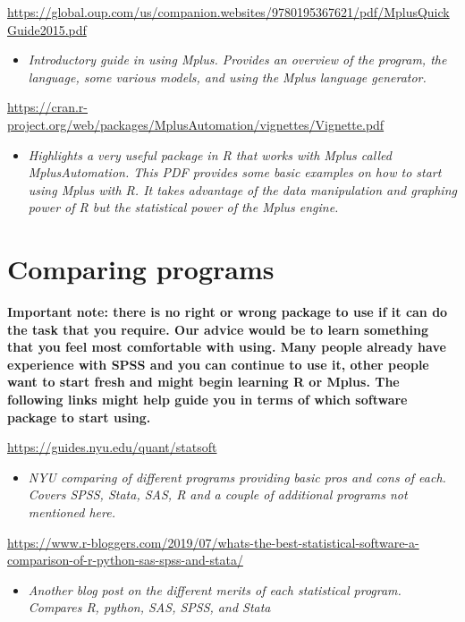 \documentclass[
]{book}
\providecommand{\tightlist}{%
  \setlength{\itemsep}{0pt}\setlength{\parskip}{0pt}}
\begin{document}
\url{https://global.oup.com/us/companion.websites/9780195367621/pdf/MplusQuickGuide2015.pdf}

\begin{itemize}
\tightlist
\item
  \emph{Introductory guide in using Mplus. Provides an overview of the program, the language, some various models, and using the Mplus language generator.}
\end{itemize}

\url{https://cran.r-project.org/web/packages/MplusAutomation/vignettes/Vignette.pdf}

\begin{itemize}
\tightlist
\item
  \emph{Highlights a very useful package in R that works with Mplus called MplusAutomation. This PDF provides some basic examples on how to start using Mplus with R. It takes advantage of the data manipulation and graphing power of R but the statistical power of the Mplus engine.}
\end{itemize}

\section{Comparing programs}\label{comparing-programs}

\textbf{Important note: there is no right or wrong package to use if it can do the task that you require. Our advice would be to learn something that you feel most comfortable with using. Many people already have experience with SPSS and you can continue to use it, other people want to start fresh and might begin learning R or Mplus. The following links might help guide you in terms of which software package to start using. }

\url{https://guides.nyu.edu/quant/statsoft}

\begin{itemize}
\tightlist
\item
  \emph{NYU comparing of different programs providing basic pros and cons of each. Covers SPSS, Stata, SAS, R and a couple of additional programs not mentioned here.}
\end{itemize}

\url{https://www.r-bloggers.com/2019/07/whats-the-best-statistical-software-a-comparison-of-r-python-sas-spss-and-stata/}

\begin{itemize}
\tightlist
\item
  \emph{Another blog post on the different merits of each statistical program. Compares R, python, SAS, SPSS, and Stata}
\end{itemize}
\end{document}
